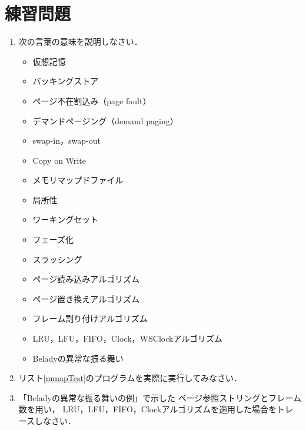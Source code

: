 \section*{練習問題}
\begin{enumerate}
  \renewcommand{\labelenumi}{\ttfamily\arabic{chapter}.\arabic{enumi}}
  \setlength{\leftskip}{1em}
\item 次の言葉の意味を説明しなさい．
  \begin{itemize}
  \item 仮想記憶
  \item バッキングストア
  \item ページ不在割込み（page fault）
  \item デマンドページング（demand paging）
  \item swap-in，swap-out
  \item Copy on Write
  \item メモリマップドファイル
  \item 局所性
  \item ワーキングセット
  \item フェーズ化
  \item スラッシング
  \item ページ読み込みアルゴリズム
  \item ページ置き換えアルゴリズム
  \item フレーム割り付けアルゴリズム
  \item LRU，LFU，FIFO，Clock，WSClockアルゴリズム
  \item Beladyの異常な振る舞い
  \end{itemize}
\item リスト\ref{mmapTest}のプログラムを実際に実行してみなさい．
\item 「Beladyの異常な振る舞いの例」で示した
  ページ参照ストリングとフレーム数を用い，
  LRU，LFU，FIFO，Clockアルゴリズムを適用した場合をトレースしなさい．
\end{enumerate}
